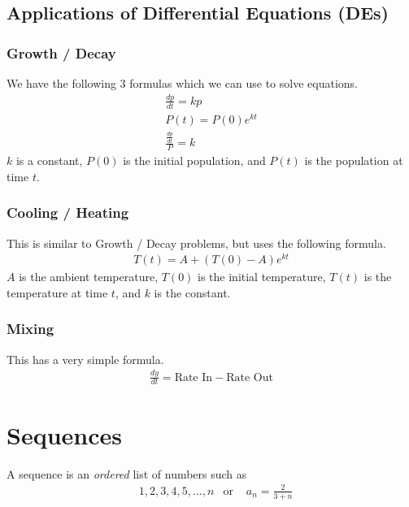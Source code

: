 \documentclass[12pt,letterpaper]{article} \usepackage{amsmath} \usepackage{graphicx}  \usepackage{longtable}  \usepackage{amssymb}
\begin{document}
        \subsection{Applications of Differential Equations (DEs)}
            \subsubsection{Growth / Decay}
            We have the following 3 formulas which we can use to solve equations.
            \begin{align*}
                \frac{dp}{dt}=kp\\
                P(t)=P(0)e^{kt}\\
                \frac{\frac{dp}{dt}}{P}=k
            \end{align*}
            $k$ is a constant, $P(0)$ is the initial population, and $P(t)$ is the population at time $t$. 

            \subsubsection{Cooling / Heating}
            This is similar to Growth / Decay problems, but uses the following formula.
            \begin{align*}
                T(t)=A+(T(0)-A)e^{kt}
            \end{align*}
            $A$ is the ambient temperature, $T(0)$ is the initial temperature, $T(t)$ is the temperature at time $t$, and $k$ is the constant.

            \subsubsection{Mixing}
            This has a very simple formula. 
            \begin{align*}
                \frac{dy}{dt}=\text{Rate In} - \text{Rate Out}
            \end{align*}

    \section{Sequences}
    A sequence is an \emph{ordered} list of numbers such as\\
    \begin{align*}
        &{1,2,3,4,5,...,n} &\text{or      } & a_n = \frac{2}{3+n}
    \end{align*}
\end{document}

